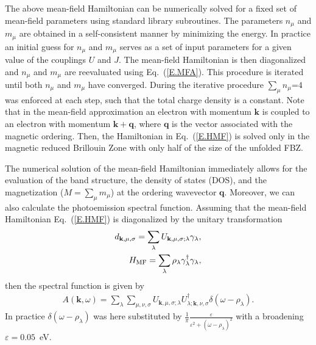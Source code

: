 \documentclass[aps,prb,superscriptaddress,preprintnumbers,
showpacs,legalpaper,twoside,twocolumn,amsmath,amssymb]{revtex4}
\begin{document}
The above mean-field Hamiltonian can be numerically solved for a fixed
set of mean-field parameters using standard
library subroutines.
The parameters $n_\mu$ and $m_\mu$ are obtained in a
self-consistent manner by minimizing the energy. In practice an
initial guess for $n_\mu$ and $m_\mu$ serves as a set of
input parameters for a given value of the
couplings $U$ and $J$.
The mean-field Hamiltonian is then diagonalized
and $n_\mu$ and $m_\mu$ are reevaluated using Eq.~(\ref{E.MFA}).
This procedure is iterated until both $n_\mu$ and $m_\mu$ have converged.
During the iterative procedure
$\sum_\mu n_\mu$=$4$ was enforced at each step, such that
the total charge density is a constant. Note
that in the mean-field approximation an electron with momentum
$\mathbf{k}$ is coupled to an electron with momentum $\mathbf{k+q}$,
where $\mathbf{q}$ is the vector associated with the magnetic ordering.
Then, the Hamiltonian in Eq.~(\ref{E.HMF}) is solved
only in the magnetic reduced Brillouin
Zone with only half of the size of the unfolded FBZ.

The numerical solution of the mean-field Hamiltonian immediately allows for the
evaluation of the band structure, the density of states (DOS), and the
magnetization ($M=\sum_\mu m_\mu$) at the ordering wavevector
$\mathbf{q}$. Moreover, we can also calculate the photoemission
spectral function. Assuming that the mean-field Hamiltonian
Eq.~(\ref{E.HMF}) is diagonalized by the unitary transformation
\begin{eqnarray}\label{diago}
d_{\mathbf{k},\mu,\sigma} = \sum_\lambda
U_{\mathbf{k},\mu,\sigma;\lambda} \gamma_\lambda, \\
H_{\rm MF} = \sum_{\lambda}
\rho_\lambda\gamma^\dagger_\lambda\gamma_\lambda,
\end{eqnarray}
then the spectral function is given by
\begin{eqnarray}\label{E.Akw}
A(\mathbf{k},\omega) = \sum_\lambda\sum_{\mu,\nu,\sigma}
U_{\mathbf{k},\mu,\sigma;\lambda}
U^\dagger_{\lambda;\mathbf{k},\nu,\sigma}
\delta(\omega-\rho_\lambda).
\end{eqnarray}
In practice $\delta(\omega-\rho_\lambda)$ was here substituted by
$\frac{1}{\pi}\frac{\varepsilon}{\varepsilon^2+(\omega-\rho_\lambda)^2}$
with a broadening $\varepsilon=0.05$~eV.
\end{document}
